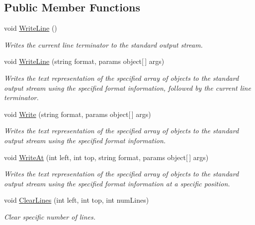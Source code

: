 \subsection*{Public Member Functions}
\begin{DoxyCompactItemize}
\item 
void \hyperlink{class_minesweeper_1_1_lib_1_1_console_renderer_a0a9b86365042b44de6c5b9da7b40dafe}{Write\+Line} ()
\begin{DoxyCompactList}\small\item\em Writes the current line terminator to the standard output stream. \end{DoxyCompactList}\item 
void \hyperlink{class_minesweeper_1_1_lib_1_1_console_renderer_afe92f94092a0a7876ec1c845ee7d78cf}{Write\+Line} (string format, params object\mbox{[}$\,$\mbox{]} args)
\begin{DoxyCompactList}\small\item\em Writes the text representation of the specified array of objects to the standard output stream using the specified format information, followed by the current line terminator. \end{DoxyCompactList}\item 
void \hyperlink{class_minesweeper_1_1_lib_1_1_console_renderer_a14f9db3445bb4f3921eada8463617e35}{Write} (string format, params object\mbox{[}$\,$\mbox{]} args)
\begin{DoxyCompactList}\small\item\em Writes the text representation of the specified array of objects to the standard output stream using the specified format information. \end{DoxyCompactList}\item 
void \hyperlink{class_minesweeper_1_1_lib_1_1_console_renderer_aa8ccd90c8c5a4e6bb02da7b546ef9c26}{Write\+At} (int left, int top, string format, params object\mbox{[}$\,$\mbox{]} args)
\begin{DoxyCompactList}\small\item\em Writes the text representation of the specified array of objects to the standard output stream using the specified format information at a specific position. \end{DoxyCompactList}\item 
void \hyperlink{class_minesweeper_1_1_lib_1_1_console_renderer_a4968ccf049f1704753728368a2519fe2}{Clear\+Lines} (int left, int top, int num\+Lines)
\begin{DoxyCompactList}\small\item\em Clear specific number of lines. \end{DoxyCompactList}\end{DoxyCompactItemize}


